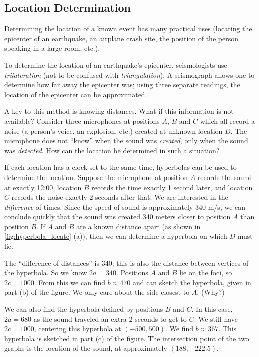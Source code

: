 \subsection*{Location Determination}

Determining the location of a known event has many practical uses (locating the epicenter of an earthquake, an airplane crash site, the position of the person speaking in a large room, etc.).

To determine the location of an earthquake's epicenter, seismologists use \textit{trilateration} (not to be confused with \textit{triangulation}). A seismograph allows one to determine how far away the epicenter was; using three separate readings, the location of the epicenter can be approximated.

A key to this method is knowing distances. What if this information is not available? Consider three microphones at positions $A$, $B$ and $C$ which all record a noise (a person's voice, an explosion, etc.) created at unknown location $D$. The microphone does not ``know'' when the sound was \textit{created}, only when the sound was \textit{detected}. How can the location be determined in such a situation?


If each location has a clock set to the same time, hyperbolas can be used to determine the location. Suppose the microphone at position $A$ records the sound at exactly 12:00, location $B$ records the time exactly 1 second later, and location $C$ records the noise exactly 2 seconds after that. We are interested in the \textit{difference} of times. Since the speed of sound is approximately 340 m/s, we can conclude quickly that the sound was created 340 meters closer to position $A$ than position $B$. If $A$ and $B$ are a known distance apart (as shown in \autoref{fig:hyperbola_locate} (a)), then we can determine a hyperbola on which $D$ must lie. 

The ``difference of distances'' is 340; this is also the distance between vertices of the hyperbola. So we know $2a= 340$. Positions $A$ and $B$ lie on the foci, so $2c=1000$. From this we can find $b\approx 470$ and can sketch the hyperbola, given in part (b) of the figure. We only care about the side closest to $A$. (Why?)

We can also find the hyperbola defined by positions $B$ and $C$. In this case, $2a = 680$ as the sound traveled an extra 2 seconds to get to $C$. We still have $2c=1000$, centering this hyperbola at $(-500,500)$. We find $b\approx 367$. This hyperbola is sketched in part (c) of the figure. The intersection point of the two graphs is the location of the sound, at approximately $(188,-222.5)$.

